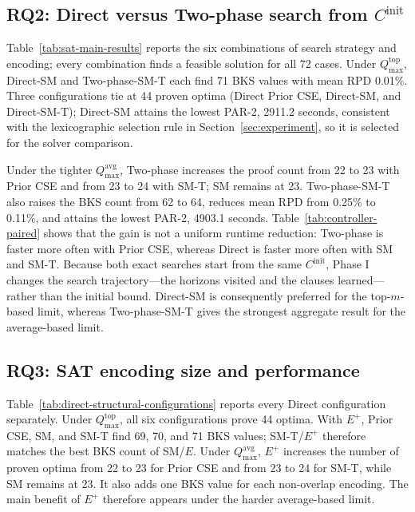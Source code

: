 \documentclass[]{interact}
\theoremstyle{plain}
\theoremstyle{definition}
\theoremstyle{remark}
\newcommand{\Cinit}{C^{\mathrm{init}}}
\begin{document}


\FloatBarrier
\subsection{RQ2: Direct versus Two-phase search from $\Cinit$}

Table~\ref{tab:sat-main-results} reports the six combinations of search strategy and encoding; every combination finds a feasible solution for all 72 cases. Under $Q_{\max}^{\mathrm{top}}$, Direct-SM and Two-phase-SM-T each find 71 BKS values with mean RPD 0.01\%. Three configurations tie at 44 proven optima (Direct Prior CSE, Direct-SM, and Direct-SM-T); Direct-SM attains the lowest PAR-2, 2911.2 seconds, consistent with the lexicographic selection rule in Section~\ref{sec:experiment}, so it is selected for the solver comparison.



Under the tighter $Q_{\max}^{\mathrm{avg}}$, Two-phase increases the proof count from 22 to 23 with Prior CSE and from 23 to 24 with SM-T; SM remains at 23. Two-phase-SM-T also raises the BKS count from 62 to 64, reduces mean RPD from 0.25\% to 0.11\%, and attains the lowest PAR-2, 4903.1 seconds. Table~\ref{tab:controller-paired} shows that the gain is not a uniform runtime reduction: Two-phase is faster more often with Prior CSE, whereas Direct is faster more often with SM and SM-T. Because both exact searches start from the same $\Cinit$, Phase I changes the search trajectory---the horizons visited and the clauses learned---rather than the initial bound. Direct-SM is consequently preferred for the top-$m$-based limit, whereas Two-phase-SM-T gives the strongest aggregate result for the average-based limit.



\FloatBarrier
\subsection{RQ3: SAT encoding size and performance}

Table~\ref{tab:direct-structural-configurations} reports every Direct configuration separately. Under $Q_{\max}^{\mathrm{top}}$, all six configurations prove 44 optima. With $E^+$, Prior CSE, SM, and SM-T find 69, 70, and 71 BKS values; SM-T/$E^+$ therefore matches the best BKS count of SM/$E$. Under $Q_{\max}^{\mathrm{avg}}$, $E^+$ increases the number of proven optima from 22 to 23 for Prior CSE and from 23 to 24 for SM-T, while SM remains at 23. It also adds one BKS value for each non-overlap encoding. The main benefit of $E^+$ therefore appears under the harder average-based limit.
\end{document}
